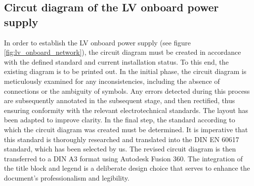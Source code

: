 
\addtocounter{page}{1} %

\subsection{Circut diagram of the LV onboard power supply}

In order to establish the LV onboard power supply (see figure \ref{fig:lv_onboard_network}), the circuit diagram must be created in accordance with the defined standard and current installation status. To this end, the existing diagram is to be printed out. In the initial phase, the circuit diagram is meticulously examined for any inconsistencies, including the absence of connections or the ambiguity of symbols. Any errors detected during this process are subsequently annotated in the subsequent stage, and then rectified, thus ensuring conformity with the relevant electrotechnical standards. The layout has been adapted to improve clarity. In the final step, the standard according to which the circuit diagram was created must be determined. It is imperative that this standard is thoroughly researched and translated into the DIN EN 60617 standard, which has been selected by us. The revised circuit diagram is then transferred to a DIN A3 format using Autodesk Fusion 360. The integration of the title block and legend is a deliberate design choice that serves to enhance the document's professionalism and legibility.


